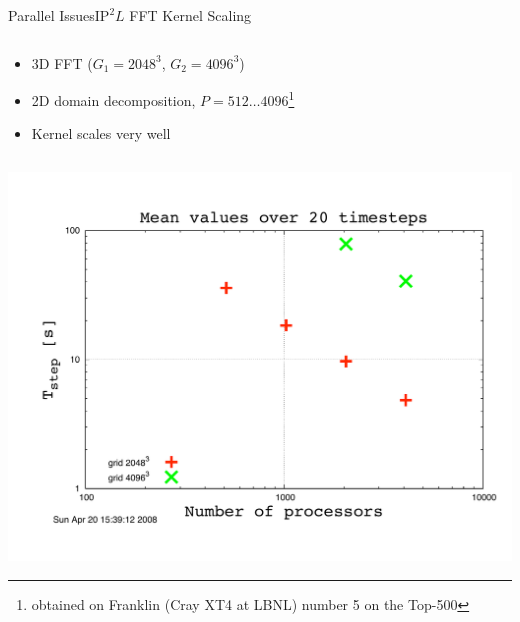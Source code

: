 \documentclass[xcolor=pdftex,table,10pt,yellow,mathserif]{beamer}
\begin{document}
\begin{frame}{Parallel Issues}{$\text{IP}^{2}L$ FFT Kernel Scaling}
  \begin{columns}
    \begin{column}{10.cm}
      \begin{block}{}
        \begin{itemize}
        \item 3D FFT ($G_1=2048^3$, $G_2=4096^3$) 
        \item 2D domain decomposition, $P= 512 \dots 4096$\footnote{obtained on Franklin (Cray XT4 at LBNL) number 5 on the Top-500}
           \item \alert{Kernel scales very well} 
        \end{itemize}
      \end{block}
      \end{column}
  \end{columns}
  \vspace{-.3cm}
      \begin{center}
      \includegraphics[scale=0.25]{figures/fft2-1-Franklin}    %
      \end{center}
\end{frame}
\end{document}
